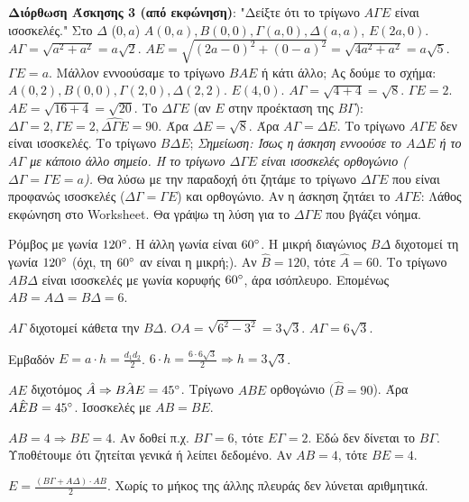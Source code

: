 \documentclass[11pt,a4paper,modern]{FFExercises}
\begin{document}
\begin{alist}
    \item \textbf{Διόρθωση Άσκησης 3 (από εκφώνηση)}: "Δείξτε ότι το τρίγωνο $A\varGamma E$ είναι ισοσκελές."
    Στο $\Delta$ ($0,a$) $A(0,a), B(0,0), \varGamma(a,0), \Delta(a,a)$, $E(2a, 0)$.
    $A\varGamma = \sqrt{a^2+a^2} = a\sqrt{2}$.
    $AE = \sqrt{(2a-0)^2 + (0-a)^2} = \sqrt{4a^2+a^2} = a\sqrt{5}$.
    $\varGamma E = a$.
    Μάλλον εννοούσαμε το τρίγωνο $BAE$ ή κάτι άλλο;
    Ας δούμε το σχήμα: $A(0,2), B(0,0), \varGamma(2,0), \Delta(2,2)$. $E(4,0)$.
    $A\varGamma = \sqrt{4+4} = \sqrt{8}$. $\varGamma E = 2$. $AE = \sqrt{16+4} = \sqrt{20}$.
    Το $\Delta\varGamma E$ (αν $E$ στην προέκταση της $B\varGamma$): $\Delta\varGamma=2, \varGamma E=2, \hat{\Delta\varGamma E}=90$. Άρα $\Delta E = \sqrt{8}$.
    Άρα $A\varGamma = \Delta E$. Το τρίγωνο $A\varGamma E$ δεν είναι ισοσκελές. Το τρίγωνο $B\Delta E$;
    \textit{Σημείωση: Ίσως η άσκηση εννοούσε το $A\Delta E$ ή το $A\varGamma$ με κάποιο άλλο σημείο. Ή το τρίγωνο $\Delta \varGamma E$ είναι ισοσκελές ορθογώνιο ($\Delta\varGamma=\varGamma E=a$).}
    Θα λύσω με την παραδοχή ότι ζητάμε το τρίγωνο $\Delta\varGamma E$ που είναι προφανώς ισοσκελές ($\Delta\varGamma=\varGamma E$) και ορθογώνιο.
    Αν η άσκηση ζητάει το $A\varGamma E$: Λάθος εκφώνηση στο Worksheet. Θα γράψω τη λύση για το $\Delta \varGamma E$ που βγάζει νόημα.
\end{alist}

\begin{alist}
    \item Ρόμβος με γωνία $120\degree$. Η άλλη γωνία είναι $60\degree$. Η μικρή διαγώνιος $B\Delta$ διχοτομεί τη γωνία $120\degree$ (όχι, τη $60\degree$ αν είναι η μικρή;). Αν $\hat{B}=120$, τότε $\hat{A}=60$. Το τρίγωνο $AB\Delta$ είναι ισοσκελές με γωνία κορυφής $60\degree$, άρα ισόπλευρο. Επομένως $AB = A\Delta = B\Delta = 6$.
    \item $A\varGamma$ διχοτομεί κάθετα την $B\Delta$. $OA = \sqrt{6^2 - 3^2} = 3\sqrt{3}$. $A\varGamma = 6\sqrt{3}$.
    \item Εμβαδόν $E = a \cdot h = \frac{d_1 d_2}{2}$. $6 \cdot h = \frac{6 \cdot 6\sqrt{3}}{2} \Rightarrow h = 3\sqrt{3}$.
\end{alist}

\begin{alist}
    \item $AE$ διχοτόμος $\hat{A} \Rightarrow \hat{BAE} = 45\degree$. Τρίγωνο $ABE$ ορθογώνιο ($\hat{B}=90$). Άρα $\hat{AEB} = 45\degree$. Ισοσκελές με $AB=BE$.
    \item $AB=4 \Rightarrow BE=4$. Αν δοθεί π.χ. $B\varGamma=6$, τότε $E\varGamma=2$. Εδώ δεν δίνεται το $B\varGamma$. Υποθέτουμε ότι ζητείται γενικά ή λείπει δεδομένο. Αν $AB=4$, τότε $BE=4$.
    \item $E = \frac{(B\varGamma+A\Delta) \cdot AB}{2}$. Χωρίς το μήκος της άλλης πλευράς δεν λύνεται αριθμητικά.
\end{alist}
\end{document}
